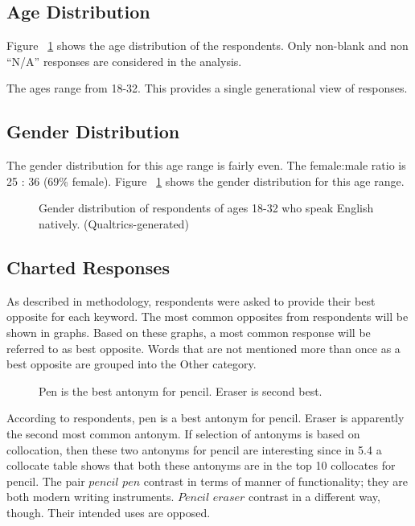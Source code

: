 

\subsection {Age Distribution} Figure ~\ref{fig:gender_distribution} shows the age distribution of the respondents.  Only non-blank and non ``N/A'' responses are considered in the analysis.

The ages range from 18-32.  This provides a single generational view of responses. 

\subsection {Gender Distribution} 
The gender distribution for this age range is fairly even.  The female:male ratio is 25 : 36 (69\% female). Figure ~\ref{fig:gender_distribution} shows the gender distribution for this age range.

\begin{figure}[here]
	\centering
	\caption{Gender distribution of respondents of ages 18-32 who speak English natively. (Qualtrics-generated)}
	\label{fig:gender_distribution}
\end{figure}

\subsection {Charted Responses} 
As described in methodology, respondents were asked to provide their best opposite for each keyword.  The most common opposites from respondents will be shown in graphs.  Based on these graphs, a most common response will be referred to as best opposite.  Words that are not mentioned more than once as a best opposite are grouped into the Other category.  
 

\begin{figure}[here]
	\centering
	\caption{Pen is the best antonym for pencil. Eraser is second best.}
	\label{fig:pencil_responses}
\end{figure}


According to respondents, pen is a best antonym for pencil.  Eraser is apparently the second most common antonym.  If selection of antonyms is based on collocation, then these two antonyms for pencil are interesting since in 5.4 a collocate table shows that both these antonyms are in the top 10 collocates for pencil.  The pair $pencil$ \opp $pen$ contrast in terms of manner of functionality; they are both modern writing instruments.  $Pencil$ \opp $eraser$ contrast in a different way, though.  Their intended uses are opposed.

